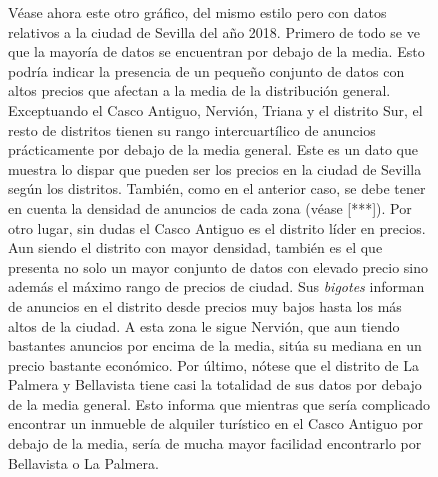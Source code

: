 \documentclass[a4paper,10pt]{article}
\begin{document}
\begin{figure}[ht]
                Véase ahora este otro gráfico, del mismo estilo pero con datos relativos a la ciudad de Sevilla del año 2018.
                Primero de todo se ve que la mayoría de datos se encuentran por debajo de la media. Esto podría indicar la presencia 
                de un pequeño conjunto de datos con altos precios que afectan a la media de la distribución general.
                Exceptuando el Casco Antiguo, Nervión, Triana y el distrito Sur, el resto de distritos tienen su rango intercuartílico de 
                anuncios prácticamente por debajo de la media general. Este es un dato que muestra lo dispar que pueden ser los precios
                en la ciudad de Sevilla según los distritos. También, como en el anterior caso, se debe tener en cuenta la densidad de anuncios
                de cada zona (véase [***]). Por otro lugar, sin dudas el Casco Antiguo es el distrito líder en precios. Aun siendo el distrito con 
                mayor densidad, también es el que presenta no solo un mayor conjunto de datos con elevado precio sino además el máximo rango de precios de 
                ciudad. Sus \textit{bigotes} informan de anuncios en el distrito desde precios muy bajos hasta los más altos de la ciudad. 
                A esta zona le sigue Nervión, que aun tiendo bastantes anuncios por encima de la media, sitúa su mediana en un precio bastante económico.
                Por último, nótese que el distrito de La Palmera y Bellavista tiene casi la totalidad de sus datos por debajo de la media general. 
                Esto informa que mientras que sería complicado encontrar un inmueble de alquiler turístico en el Casco Antiguo por debajo de la media, 
                sería de mucha mayor facilidad encontrarlo por Bellavista o La Palmera. 

            \end{figure}

            \clearpage
\end{document}
